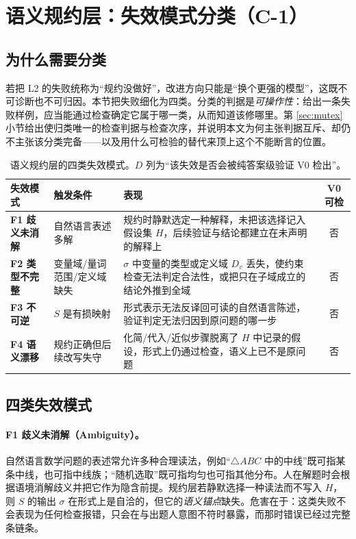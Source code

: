 \section{语义规约层：失效模式分类（C-1）}\label{sec:failure}

\subsection{为什么需要分类}

若把 L2 的失败统称为“规约没做好”，改进方向只能是“换个更强的模型”，这既不可诊断也不可归因。本节把失败细化为四类。分类的判据是\emph{可操作性}：给出一条失败样例，应当能通过检查确定它属于哪一类，从而知道该修哪里。第 \ref{sec:mutex} 小节给出使归类唯一的检查判据与检查次序，并说明本文为何主张判据互斥、却仍不主张该分类完备——以及用什么可检验的替代来顶上这个不能断言的位置。

\begin{table}[t]
\centering
\small
\caption{语义规约层的四类失效模式。$D$ 列为“该失效是否会被纯答案级验证 V0 检出”。}
\label{tab:failures}
\begin{tabularx}{\textwidth}{@{}>{\raggedright\arraybackslash}p{2.6cm} >{\raggedright\arraybackslash}p{3.5cm} >{\raggedright\arraybackslash}X c@{}}
\toprule
\textbf{失效模式} & \textbf{触发条件} & \textbf{表现} & \textbf{V0 可检} \\
\midrule
\textbf{F1 歧义未消解} & 自然语言表述多解 & 规约时静默选定一种解释，未把该选择记入假设集 $H$，后续验证与结论都建立在未声明的解释上 & 否 \\
\addlinespace
\textbf{F2 类型不完整} & 变量域/量词范围/定义域缺失 & $\sigma$ 中变量的类型或定义域 $D_v$ 丢失，使约束检查无法判定合法性，或把只在子域成立的结论外推到全域 & 否 \\
\addlinespace
\textbf{F3 不可逆} & $S$ 是有损映射 & 形式表示无法反译回可读的自然语言陈述，验证判定无法归因到原问题的哪一步 & 否 \\
\addlinespace
\textbf{F4 语义漂移} & 规约正确但后续改写失守 & 化简/代入/近似步骤脱离了 $H$ 中记录的假设，形式上仍通过检查，语义上已不是原问题 & 否 \\
\bottomrule
\end{tabularx}
\end{table}

\subsection{四类失效模式}

\paragraph{F1 歧义未消解（Ambiguity）。}自然语言数学问题的表述常允许多种合理读法，例如“$\triangle ABC$ 中的中线”既可指某条中线，也可指中线族；“随机选取”既可指均匀也可指其他分布。人在解题时会根据语境消解歧义并把它作为隐含前提。规约层若静默选择一种读法而不写入 $H$，则 $S$ 的输出 $\sigma$ 在形式上是自洽的，但它的\emph{语义锚点}缺失。危害在于：这类失败不会表现为任何检查报错，只会在与出题人意图不符时暴露，而那时错误已经过完整条链条。

